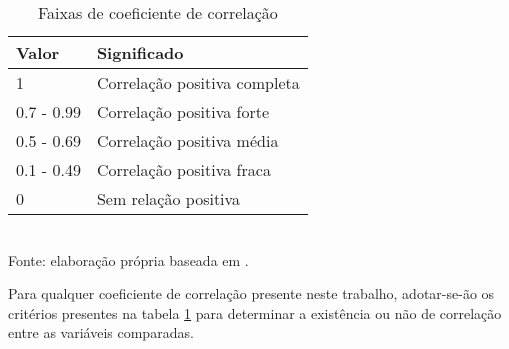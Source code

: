 \begin{table}[H]
\caption{Faixas de coeficiente de correlação}
\label{tab:faixas-coeficiente-correlacao}
\begin{tabular}{@{}ll@{}}
\toprule
Valor      & Significado                  \\ \midrule
1          & Correlação positiva completa \\ \midrule
0.7 - 0.99 & Correlação positiva forte    \\ \midrule
0.5 - 0.69 & Correlação positiva média    \\ \midrule
0.1 - 0.49 & Correlação positiva fraca    \\ \midrule
0          & Sem relação positiva         \\ \bottomrule
\end{tabular}
\\ \footnotesize{Fonte: elaboração própria baseada em \cite{ali2022spearman}.}
\end{table}

Para qualquer coeficiente de correlação presente neste trabalho, adotar-se-ão os critérios presentes na tabela \ref{tab:faixas-coeficiente-correlacao} para determinar a existência ou não de correlação entre as variáveis comparadas.

